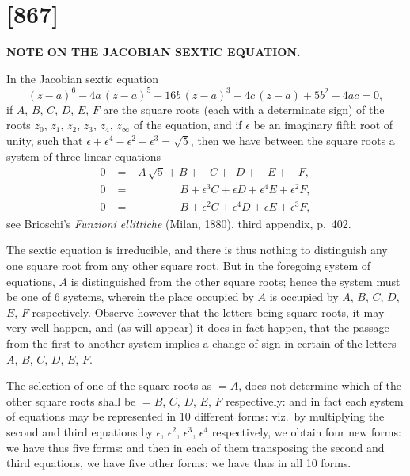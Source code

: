 \documentclass[11pt,a4paper]{book}
\begin{document}
\newpage
\section*{[867]}
\begin{center}
\large\textbf{NOTE ON THE JACOBIAN SEXTIC EQUATION.}
\end{center}

\begin{flushright}
\end{flushright}

In the Jacobian sextic equation
\[
(z-a)^6 - 4a\,(z-a)^5 + 16b\,(z-a)^3 - 4c\,(z-a) + 5b^2 - 4ac = 0,
\]
if $A$, $B$, $C$, $D$, $E$, $F$ are the square roots (each with a determinate sign) of the
roots $z_0$, $z_1$, $z_2$, $z_3$, $z_4$, $z_\infty$ of the equation, and if $\epsilon$ be an imaginary fifth root of
unity, such that $\epsilon + \epsilon^4 - \epsilon^2 - \epsilon^3 = \sqrt{5}$, then we have between the square roots a system
of three linear equations
\begin{align*}
0 &= -A\,\sqrt{5} + B + \phantom{\epsilon^3}C + \phantom{\epsilon}D + \phantom{\epsilon^4}E + \phantom{\epsilon^2}F,\\
0 &= \phantom{-A\sqrt{5} +}\; B + \epsilon^3 C + \epsilon D + \epsilon^4 E + \epsilon^2 F,\\
0 &= \phantom{-A\sqrt{5} +}\; B + \epsilon^2 C + \epsilon^4 D + \epsilon E + \epsilon^3 F,
\end{align*}
see Brioschi's \textit{Funzioni ellittiche} (Milan, 1880), third appendix, p.~402.

The sextic equation is irreducible, and there is thus nothing to distinguish any
one square root from any other square root. But in the foregoing system of equations,
$A$ is distinguished from the other square roots; hence the system must be one of
6 systems, wherein the place occupied by $A$ is occupied by $A$, $B$, $C$, $D$, $E$, $F$
respectively. Observe however that the letters being square roots, it may very well
happen, and (as will appear) it does in fact happen, that the passage from the first
to another system implies a change of sign in certain of the letters $A$, $B$, $C$, $D$, $E$, $F$.

The selection of one of the square roots as $= A$, does not determine which of
the other square roots shall be $= B$, $C$, $D$, $E$, $F$ respectively: and in fact each system
of equations may be represented in 10 different forms: viz.\ by multiplying the second
and third equations by $\epsilon$, $\epsilon^2$, $\epsilon^3$, $\epsilon^4$ respectively, we obtain four new forms: we have
thus five forms: and then in each of them transposing the second and third equations,
we have five other forms: we have thus in all 10 forms.
\end{document}
